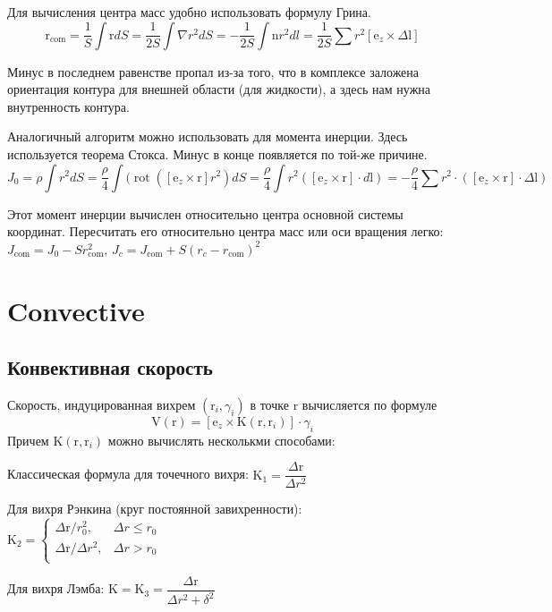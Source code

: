 \documentclass[14pt]{extreport}
\newcommand{\br}[1]{\boldsymbol{\mathrm{#1}}}
\DeclareMathOperator{\rot}{rot}
\newenvironment{packed_enum}{
\begin{enumerate}
  \setlength{\itemsep}{1pt}
  \setlength{\parskip}{0pt}
  \setlength{\parsep}{0pt}
}{\end{enumerate}}
\begin{document}
Для вычисления центра масс удобно использовать формулу Грина.
\begin{equation*}
\br r_\text{com} = \dfrac{1}{S}\int \br r dS = \dfrac{1}{2S}\int\nabla r^2 dS = -\dfrac{1}{2S}\int \br n r^2 dl = \dfrac{1}{2S} \sum r^2 [\br e_z \times \Delta \br l]
\end{equation*}

Минус в последнем равенстве пропал из-за того, что в комплексе заложена ориентация контура для внешней области (для жидкости), а здесь нам нужна внутренность контура.

Аналогичный алгоритм можно использовать для момента инерции. Здесь используется теорема Стокса. Минус в конце появляется по той-же причине.
\begin{equation*}
J_0 = \rho \int r^2 dS = \dfrac{\rho}{4}\int(\rot([\br e_z \times \br r] r^2) dS = \dfrac{\rho}{4}\int r^2 ([\br e_z \times \br r] \cdot d \br l) = -\dfrac{\rho}{4} \sum r^2 \cdot ([\br e_z \times \br r] \cdot \Delta \br l)
\end{equation*}

Этот момент инерции вычислен относительно центра основной системы координат. Пересчитать его относительно центра масс или оси вращения легко: $J_\text{com} = J_0 - S r_\text{com}^2$, $J_c = J_\text{com} + S (r_c - r_\text{com})^2$

\section{Convective}
\subsection{Конвективная скорость}
Скорость, индуцированная вихрем $(\br r_i, \gamma_i)$ в точке $\br r$
вычисляется по формуле
\begin{equation*}
\br V(\br r) = [\br e_z \times \br K(\br r, \br r_i)] \cdot \gamma_i
\end{equation*}
Причем $\br K (\br r, \br r_i)$ можно вычислять несколькми способами:
\begin{packed_enum}
\item Классическая формула для точечного вихря:
$\br K_1 = \dfrac {\Delta\br r}{\Delta r^2}$

\item Для вихря Рэнкина (круг постоянной завихренности):
$\br K_2 = \begin{cases}
\Delta\br r / r_0^2,	&\Delta r \le r_0 \\
{\Delta\br r}/{\Delta r^2}, 	&\Delta r>r_0\\
\end{cases}$

\item Для вихря Лэмба:
$\br K = \br K_3 = \dfrac {\Delta\br r}{\Delta r^2 + \delta^2}$
\end{packed_enum}
\end{document}

